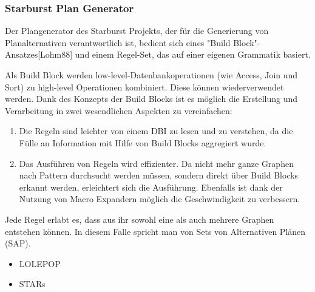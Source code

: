 \subsubsection{Starburst Plan Generator}

Der Plangenerator des Starburst Projekts, der für die Generierung von Planalternativen verantwortlich ist, bedient sich eines "Build Block"-Ansatzes[Lohm88] und einem Regel-Set, das auf einer eigenen Grammatik basiert.  

Als Build Block werden low-level-Datenbankoperationen (wie Access, Join und Sort) zu high-level Operationen kombiniert. Diese können wiederverwendet werden. Dank des Konzepts der Build Blocks ist es möglich die Erstellung und Verarbeitung in zwei wesendlichen Aspekten zu vereinfachen:


\begin{enumerate}


\item Die Regeln sind leichter von einem DBI zu lesen und zu verstehen, da die Fülle an Information mit Hilfe von Build Blocks aggregiert wurde.

\item Das Ausführen von Regeln wird effizienter. Da nicht mehr ganze Graphen nach Pattern durchsucht werden müssen, sondern direkt über Build Blocks erkannt werden, erleichtert sich die Ausführung. Ebenfalls ist dank der Nutzung von Macro Expandern möglich die Geschwindigkeit zu verbessern.


\end{enumerate}



Jede Regel erlabt es, dass aus ihr sowohl eine als auch mehrere Graphen entstehen können. In diesem Falle spricht man von Sets von Alternativen Plänen (SAP). 


\begin{itemize}
\item LOLEPOP
\item STARs
\end{itemize}

 